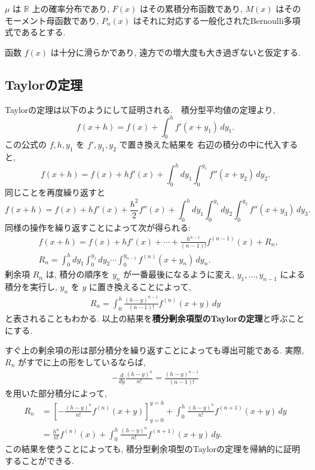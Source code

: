 \documentclass[12pt,twoside]{jarticle}
\newcommand\BF{\bfseries}
\newcommand\R{{\mathbb R}} %
\theoremstyle{jplain}
\theoremstyle{jplain}
\theoremstyle{jplain}
\numberwithin{theorem}{section}
\numberwithin{equation}{section}
\numberwithin{figure}{section}
\numberwithin{table}{section}
\begin{document}
$\mu$ は $\R$ 上の確率分布であり, $F(x)$ はその累積分布函数であり,
$M(x)$ はそのモーメント母函数であり,
$P_n(x)$ はそれに対応する一般化されたBernoulli多項式であるとする.

函数 $f(x)$ は十分に滑らかであり, 遠方での増大度も大き過ぎないと仮定する.


\subsection{Taylorの定理}
\label{sec:Taylor}

Taylorの定理は以下のようにして証明される.　積分型平均値の定理より,
\[
f(x+h) = f(x) + \int_0^h f'(x+y_1)\,dy_1.
\]
この公式の $f,h,y_1$ を $f',y_1,y_2$ で置き換えた結果を
右辺の積分の中に代入すると,
\[
f(x+h) = f(x) + h f'(x) + \int_0^h dy_1\int_0^{y_1} f''(x+y_2)\,dy_2.
\]
同じことを再度繰り返すと
\[
f(x+h)
= f(x) + h f'(x) + \frac{h^2}2 f''(x)
+ \int_0^h dy_1\int_0^{y_1}dy_2\int_0^{y_2} f''(x+y_3)\,dy_3.
\]
同様の操作を繰り返すことによって次が得られる:
\begin{align*}
  &
  f(x+h)=f(x)+hf'(x)+\cdots+\frac{h^{n-1}}{(n-1)!}f^{(n-1)}(x)+R_n,
  \\ &
  R_n =
  \int_0^h dy_1\int_0^{y_1}dy_2
  \cdots\int_0^{y_{n-1}}f^{(n)}(x+y_n)\,dy_n.
\end{align*}
剰余項 $R_n$ は, 積分の順序を $y_n$ が一番最後になるように変え,
$y_1,\ldots,y_{n-1}$ による積分を実行し,
$y_n$ を $y$ に置き換えることによって,
\begin{align*}
  R_n = \int_0^h \frac{(h-y)^{n-1}}{(n-1)!}f^{(n)}(x+y)\,dy
\end{align*}
と表されることもわかる.
以上の結果を{\BF 積分剰余項型のTaylorの定理}と呼ぶことにする.

すぐ上の剰余項の形は部分積分を繰り返すことによっても導出可能である.
実際, $R_n$ がすでに上の形をしているならば,
\begin{align*}
  -\frac{d}{dy}\frac{(h-y)^n}{n!} = \frac{(h-y)^{n-1}}{(n-1)!}
\end{align*}
を用いた部分積分によって,
\begin{align*}
  R_n
  &= \left[-\frac{(h-y)^n}{n!}f^{(n)}(x+y)\right]_{y=0}^{y=h}
  + \int_0^h \frac{(h-y)^n}{n!} f^{(n+1)}(x+y)\,dy
  \\
  & = \frac{h^n}{n!}f^{(n)}(x)
  + \int_0^h \frac{(h-y)^n}{n!} f^{(n+1)}(x+y)\,dy.
\end{align*}
この結果を使うことによっても,
積分型剰余項型のTaylorの定理を帰納的に証明することができる.
\end{document}
